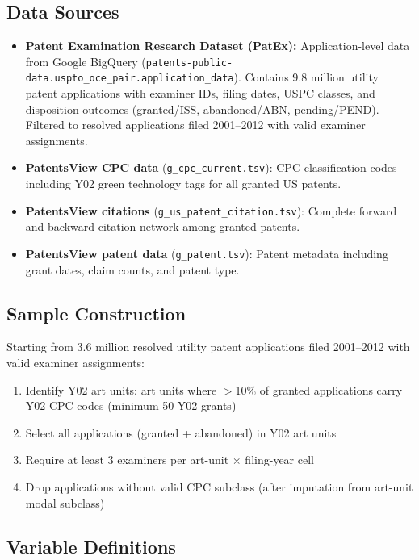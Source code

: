 \documentclass[12pt]{article}
\begin{document}
\subsection{Data Sources}

\begin{itemize}
\item \textbf{Patent Examination Research Dataset (PatEx):} Application-level data from Google BigQuery (\texttt{patents-public-data.uspto\_oce\_pair.application\_data}). Contains 9.8 million utility patent applications with examiner IDs, filing dates, USPC classes, and disposition outcomes (granted/ISS, abandoned/ABN, pending/PEND). Filtered to resolved applications filed 2001--2012 with valid examiner assignments.
\item \textbf{PatentsView CPC data} (\texttt{g\_cpc\_current.tsv}): CPC classification codes including Y02 green technology tags for all granted US patents.
\item \textbf{PatentsView citations} (\texttt{g\_us\_patent\_citation.tsv}): Complete forward and backward citation network among granted patents.
\item \textbf{PatentsView patent data} (\texttt{g\_patent.tsv}): Patent metadata including grant dates, claim counts, and patent type.
\end{itemize}

\subsection{Sample Construction}

Starting from 3.6 million resolved utility patent applications filed 2001--2012 with valid examiner assignments:
\begin{enumerate}
\item Identify Y02 art units: art units where $>$10\% of granted applications carry Y02 CPC codes (minimum 50 Y02 grants)
\item Select all applications (granted + abandoned) in Y02 art units
\item Require at least 3 examiners per art-unit $\times$ filing-year cell
\item Drop applications without valid CPC subclass (after imputation from art-unit modal subclass)
\end{enumerate}

\subsection{Variable Definitions}
\end{document}
